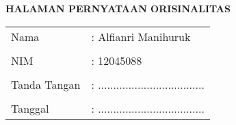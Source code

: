 \clearpage
{}%

\begin{center}
	\smallskip
	
	\normalsize \bfseries \MakeUppercase{Halaman Pernyataan Orisinalitas} \linebreak
	
	\normalsize {}
	\vspace{3cm}
	
	\centering 
	\begin{tabular}{l l}
		Nama 			& : Alfianri Manihuruk \\
		& \\
		NIM 			& : 12045088 \\
		& \\
		Tanda Tangan 	& : ................................... \\
		& \\
		Tanggal 		& : ................................... \\
	\end{tabular}
	
\end{center}
\clearpage
